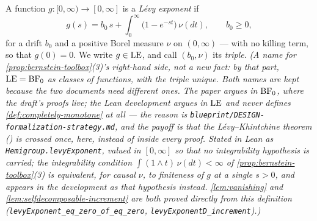 \begin{definition}\label{def:levy-exponent}
\leanok
A function $g : [0,\infty) \to [0,\infty]$ is a \emph{Lévy exponent} if
\[
  g(s) = b_0\,s + \int_0^\infty \bigl(1 - e^{-st}\bigr)\,\nu(dt),
  \qquad b_0 \ge 0,
\]
for a drift $b_0$ and a positive Borel measure $\nu$ on $(0,\infty)$ --- with no killing term,
so that $g(0) = 0$. We write $g \in \mathrm{LE}$, and call $(b_0, \nu)$ its \emph{triple}.
\statusT\quad\emph{(A \emph{name} for \ref{prop:bernstein-toolbox}(3)'s right-hand side, not a
new fact: by that part, $\mathrm{LE} = \mathrm{BF}_0$ as classes of functions, with the triple unique. Both names
are kept because the two documents need different ones. The paper argues in $\mathrm{BF}_0$, where the
draft's proofs live; the Lean development argues in $\mathrm{LE}$ and never defines
\ref{def:completely-monotone} at all --- the reason is \texttt{blueprint/DESIGN-formalization-strategy.md},
and the payoff is that the Lévy--Khintchine theorem () is crossed once, here, instead
of inside every proof. Stated in Lean as \texttt{Hemigroup.levyExponent}, valued in
$[0,\infty]$ so that no integrability hypothesis is carried; the integrability condition
$\int (1 \wedge t)\,\nu(dt) < \infty$ of \ref{prop:bernstein-toolbox}(3) is equivalent, for
causal $\nu$, to finiteness of $g$ at a single $s > 0$, and appears in the development as that
hypothesis instead. \ref{lem:vanishing} and \ref{lem:selfdecomposable-increment}
are both proved directly from this definition
(\texttt{levyExponent\_eq\_zero\_of\_eq\_zero}, \texttt{levyExponentD\_increment}).)}
\end{definition}

